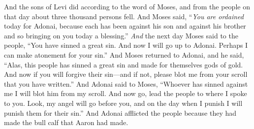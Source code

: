 \begin{biblechapter}
\verse And the sons of Levi did according to the word of Moses, and from the people on that day about three thousand persons fell.
\verse And Moses said, “\textit{You are ordained} today for Adonai, because each has been against his son and against his brother and so bringing on you today a blessing.”
\verse \textit{And} the next day Moses said to the people, “You have sinned a great sin. And now I will go up to Adonai. Perhaps I can make atonement for your sin.”
\verse And Moses returned to Adonai, and he said, “Alas, this people has sinned a great sin and made for themselves gods of gold.
\verse And now if you will forgive their sin—and if not, please blot me from your scroll that you have written.”
\verse And Adonai said to Moses, “Whoever has sinned against me I will blot him from my scroll.
\verse And now go, lead the people to where I spoke to you. Look, my angel will go before you, and on the day when I punish I will punish them for their sin.”
\verse And Adonai afflicted the people because they had made the bull calf that Aaron had made.
\end{biblechapter}

